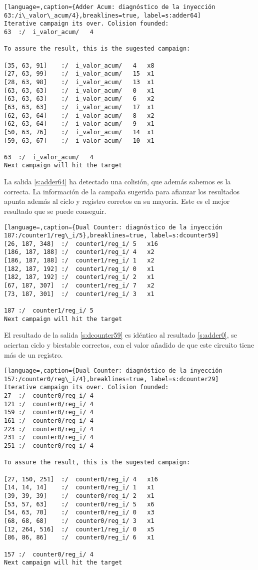 \begin{lstlisting}[language=,caption={Adder Acum: diagnóstico de la inyección
63:/i\_valor\_acum/4},breaklines=true, label=s:adder64]
Iterative campaign its over. Colision founded:
63	:/	i_valor_acum/	4

To assure the result, this is the sugested campaign:

[35, 63, 91]	:/	i_valor_acum/	4	x8
[27, 63, 99]	:/	i_valor_acum/	15	x1
[28, 63, 98]	:/	i_valor_acum/	13	x1
[63, 63, 63]	:/	i_valor_acum/	0	x1
[63, 63, 63]	:/	i_valor_acum/	6	x2
[63, 63, 63]	:/	i_valor_acum/	17	x1
[62, 63, 64]	:/	i_valor_acum/	8	x2
[62, 63, 64]	:/	i_valor_acum/	9	x1
[50, 63, 76]	:/	i_valor_acum/	14	x1
[59, 63, 67]	:/	i_valor_acum/	10	x1

63	:/	i_valor_acum/	4
Next campaign will hit the target
\end{lstlisting}

La salida \ref{s:adder64} ha detectado una colisión, que además sabemos es la
correcta. La información de la campaña sugerida para afianzar los resultados
apunta además al ciclo y registro corretos en su mayoría. Este es el mejor
resultado que se puede conseguir.

\begin{lstlisting}[language=,caption={Dual Counter: diagnóstico de la inyección
187:/counter1/reg\_i/5},breaklines=true, label=s:dcounter59]
[26, 187, 348]	:/	counter1/reg_i/	5	x16
[186, 187, 188]	:/	counter1/reg_i/	4	x2
[186, 187, 188]	:/	counter1/reg_i/	1	x2
[182, 187, 192]	:/	counter1/reg_i/	0	x1
[182, 187, 192]	:/	counter1/reg_i/	2	x1
[67, 187, 307]	:/	counter1/reg_i/	7	x2
[73, 187, 301]	:/	counter1/reg_i/	3	x1

187	:/	counter1/reg_i/	5
Next campaign will hit the target
\end{lstlisting}

El resultado de la salida \ref{s:dcounter59} es idéntico al resultado
\ref{s:adder0}, se aciertan ciclo y biestable correctos, con el valor añadido de
que este circuito tiene más de un registro.

\begin{lstlisting}[language=,caption={Dual Counter: diagnóstico de la inyección
157:/counter0/reg\_i/4},breaklines=true, label=s:dcounter29]
Iterative campaign its over. Colision founded:
27	:/	counter0/reg_i/	4
121	:/	counter0/reg_i/	4
159	:/	counter0/reg_i/	4
161	:/	counter0/reg_i/	4
223	:/	counter0/reg_i/	4
231	:/	counter0/reg_i/	4
251	:/	counter0/reg_i/	4

To assure the result, this is the sugested campaign:

[27, 150, 251]	:/	counter0/reg_i/	4	x16
[14, 14, 14]	:/	counter0/reg_i/	1	x1
[39, 39, 39]	:/	counter0/reg_i/	2	x1
[53, 57, 63]	:/	counter0/reg_i/	5	x6
[54, 63, 70]	:/	counter0/reg_i/	0	x3
[68, 68, 68]	:/	counter0/reg_i/	3	x1
[12, 264, 516]	:/	counter1/reg_i/	0	x5
[86, 86, 86]	:/	counter0/reg_i/	6	x1

157	:/	counter0/reg_i/	4
Next campaign will hit the target
\end{lstlisting}

